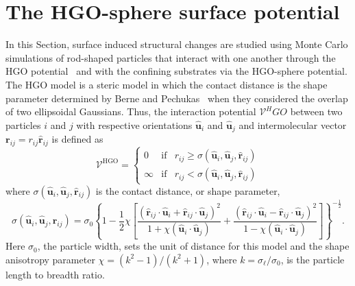 \documentclass[aps,10pt,twocolumn]{revtex4}
\newcommand{\mrm}[1]{\ensuremath{\mathrm{#1}}}
\newcommand{\vect}[1]{ \mathbf{#1} }
\newcommand{\vecth}[1]{ \mathbf{\hat{#1} } }
\newcommand{\lp}{\left(}
\newcommand{\rp}{\right)}
\newcommand{\so}{\sigma_0}
\newcommand{\sel}{\sigma_\ell}
\newcommand{\rij}{\vecth{r}_{ij}}
\newcommand{\ui}{\vecth{u}_i}
\newcommand{\uj}{\vecth{u}_j}
\newcommand{\sijr}{\sigma(\ui,\uj,\rij)}
\newcommand{\dotProd}[2]{ #1 \cdot #2 }
\begin{document}
\section{The HGO-sphere surface potential}
\label{s:RSP} In this Section, surface induced structural changes are studied using Monte Carlo simulations of
rod-shaped particles that interact with one another through the HGO potential~\cite{Rigby89} and with the
confining substrates via the HGO-sphere potential. The HGO model is a steric model in which the contact distance
is the shape parameter determined by Berne and Pechukas~\cite{BernePechukas72} when they considered the overlap of
two ellipsoidal Gaussians.  Thus, the interaction potential $\mathcal{V}^HGO$ between two particles $i$ and
$j$ with respective orientations $\ui$ and $\uj$ and intermolecular vector $\vect{r}_{ij} = r_{ij}\rij$ is defined
as
\begin{equation}
    \mathcal{V}^\mrm{HGO} = \left\{  %
    \begin{array}{ccc}
    0   &\mrm{if}   &r_{ij} \geq \sijr  \\
    \infty  &\mrm{if}   &r_{ij} < \sijr
    \end{array}
    \right.
\end{equation}
where $\sijr$ is the contact distance, or shape parameter,
\begin{equation}
\label{eqn:HGO_sigma}
    \sijr = \so\left\{
    1 - \frac{1}{2}\chi\left[
    \frac{ \lp\dotProd{\rij}{\ui} + \dotProd{\rij}{\uj}\rp^2 }{1 + \chi(\dotProd{\ui}{\uj})}
    + \frac{ \lp\dotProd{\rij}{\ui} - \dotProd{\rij}{\uj}\rp^2 }{1 - \chi(\dotProd{\ui}{\uj})}
    \right] \right\}^{-\frac{1}{2}}.
\end{equation}
Here $\so$, the particle width, sets the unit of distance for this model and the shape anisotropy parameter $\chi
= (k^2-1)/(k^2+1)$, where $k= \sel/\so$, is the particle length to breadth ratio.
\end{document}
